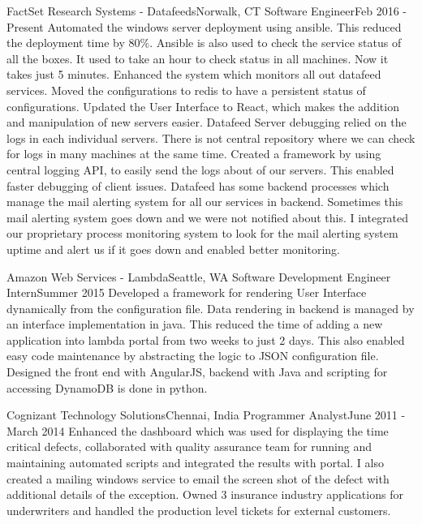     \resumeSubheading
      {FactSet Research Systems - Datafeeds}{Norwalk, CT}
      {Software Engineer}{Feb 2016 - Present}
      \resumeItemListStart
          {Automated the windows server deployment using ansible. This reduced the deployment time by 80\%. Ansible is also used to check the service status of all the boxes. It used to take an hour to check status in all machines. Now it takes just 5 minutes.}
          {Enhanced the system which monitors all out datafeed services. Moved the configurations to redis to have a persistent status of configurations. Updated the User Interface to React, which makes the addition and manipulation of new servers easier.}
          {Datafeed Server debugging relied on the logs in each individual servers. There is not central repository where we can check for logs in many machines at the same time. Created a framework by using central logging API, to easily send the logs about of our servers. This enabled faster debugging of client issues. }
          {Datafeed has some backend processes which manage the mail alerting system for all our services in backend. Sometimes this mail alerting system goes down and we were not notified about this. I integrated our proprietary process monitoring system to look for the mail alerting system uptime and alert us if it goes down and enabled better monitoring. }
      \resumeItemListEnd

    \resumeSubheading
      {Amazon Web Services - Lambda}{Seattle, WA}
      {Software Development Engineer Intern}{Summer 2015}
      \resumeItemListStart
          {Developed a framework for rendering User Interface dynamically from the configuration file. Data rendering in backend is managed by an interface implementation in java. This reduced the time of adding a new application into lambda portal from two weeks to just 2 days. This also enabled easy code maintenance by abstracting the logic to JSON configuration file. Designed the front end with AngularJS, backend with Java and scripting for accessing DynamoDB is done in python. }
      \resumeItemListEnd

    \resumeSubheading
      {Cognizant Technology Solutions}{Chennai, India}
      {Programmer Analyst}{June 2011 - March 2014}
      \resumeItemListStart
          {Enhanced the dashboard which was used for displaying the time critical defects, collaborated with quality assurance team for running and maintaining automated scripts and integrated the results with portal. I also created a mailing windows service to email the screen shot of the defect with additional details of the exception.}
          {Owned 3 insurance industry applications for underwriters and handled the production level tickets for external customers.}
      \resumeItemListEnd

